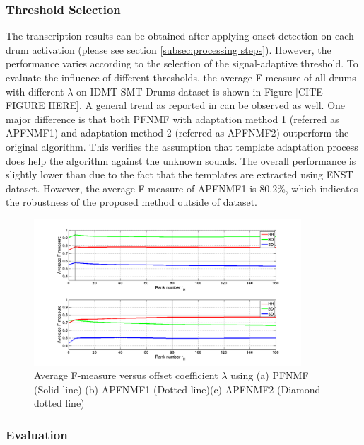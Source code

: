 \documentclass{article}
\begin{document}
\subsubsection{Threshold Selection}\label{subsec:threshold}
The transcription results can be obtained after applying onset detection on each drum activation (please see section \ref{subsec:processing steps}). However, the performance varies according to the selection of the signal-adaptive threshold. To evaluate the influence of different thresholds, the average F-measure of all drums with different $\lambda$ on IDMT-SMT-Drums dataset is shown in Figure [CITE FIGURE HERE]. A general trend as reported in \cite{Dittmar2014} can be observed as well. One major difference is that both PFNMF with adaptation method 1 (referred as APFNMF1) and adaptation method 2 (referred as APFNMF2) outperform the original algorithm. This verifies the assumption that template adaptation process does help the algorithm against the unknown sounds. The overall performance is slightly lower than \cite{Dittmar2014} due to the fact that the templates are extracted using ENST dataset. However, the average F-measure of APFNMF1 is 80.2\%, which indicates the robustness of the proposed method outside of dataset. 

\begin{figure}
 \centerline{
 \includegraphics[width=10cm]{testOnK_mono_poly.png}}
 \caption{Average F-measure versus offset coefficient $\lambda$ using (a) PFNMF (Solid line) (b) APFNMF1 (Dotted line)(c) APFNMF2 (Diamond dotted line)}%
 \label{fig:thresTest}
\end{figure}



\subsubsection{Evaluation}\label{subsec:Evaluation}
\end{document}
